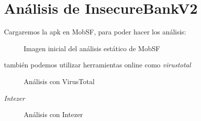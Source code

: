 \documentclass[12pt,twoside]{article}
\begin{document}
\newpage
\section{Análisis de InsecureBankV2}
Cargaremos la apk en MobSF, para poder hacer los análisis:
\begin{figure}[H]
    \centering
    \caption{Imagen inicial del análisis estático de MobSF}
\end{figure}
también podemos utilizar herramientas online como \textit{virustotal}
\begin{figure}[H]
    \centering
    \caption{Análisis con VirusTotal}
\end{figure}
\textit{Intezer}
\begin{figure}[H]
    \centering
    \caption{Análisis con Intezer}
\end{figure}
\end{document}
